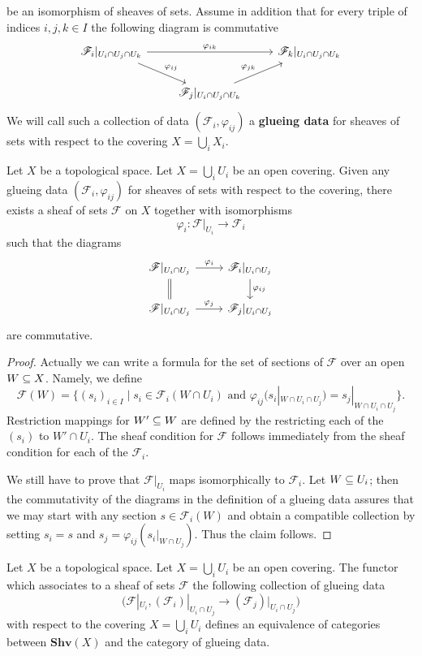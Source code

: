 be an isomorphism of sheaves of sets. Assume in addition that for every triple of indices $i,j,k\in I$ the following diagram is commutative
\[\begin{tikzcd}
\mathscr{F}_i|_{U_i\cap U_j\cap U_k}\ar[rr,"\varphi_{ik}"]\ar[rd,"\varphi_{ij}"]&&\mathscr{F}_k|_{U_i\cap U_j\cap U_k}\\
&\mathscr{F}_j|_{U_i\cap U_j\cap U_k}\ar[ru,"\varphi_{jk}"]
\end{tikzcd}\]
We will call such a collection of data $(\mathscr{F}_i,\varphi_{ij})$ a \textbf{glueing data} for sheaves of sets with respect to the covering $X=\bigcup_iX_i$.
\begin{proposition}\label{sheaf glue construction}
Let $X$ be a topological space. Let $X=\bigcup_iU_i$ be an open covering. Given any glueing data $(\mathscr{F}_i,\varphi_{ij})$ for sheaves of sets with respect to the covering, there exists a sheaf of sets $\mathscr{F}$ on $X$ together with isomorphisms
\[\varphi_i:\mathscr{F}|_{U_i}\to\mathscr{F}_i\]
such that the diagrams
\[\begin{tikzcd}
\mathscr{F}|_{U_i\cap U_j}\ar[r,"\varphi_i"]\ar[d,equal]&\mathscr{F}_i|_{U_i\cap U_j}\ar[d,"\varphi_{ij}"]\\
\mathscr{F}|_{U_i\cap U_j}\ar[r,"\varphi_j"]&\mathscr{F}_j|_{U_i\cap U_j}
\end{tikzcd}\]
are commutative.
\end{proposition}
\begin{proof}
Actually we can write a formula for the set of sections of $\mathscr{F}$ over an open $W\subseteq X$. Namely, we define
\[\mathscr{F}(W)=\{(s_i)_{i\in I}\mid\text{$s_i\in\mathscr{F}_i(W\cap U_i)$ and $\varphi_{ij}(s_i|_{W\cap U_i\cap U_j})=s_j|_{W\cap U_i\cap U_j}$}\}.\]
Restriction mappings for $W'\subseteq W$ are defined by the restricting each of the $(s_i)$ to $W'\cap U_i$. The sheaf condition for $\mathscr{F}$ follows immediately from the sheaf condition for each of the $\mathscr{F}_i$.\par
We still have to prove that $\mathscr{F}|_{U_i}$ maps isomorphically to $\mathscr{F}_i$. Let $W\subseteq U_i$; then the commutativity of the diagrams in the definition of a glueing data assures that we may start with any section $s\in\mathscr{F}_i(W)$ and obtain a compatible collection by setting $s_i=s$ and $s_j=\varphi_{ij}(s_{i}|_{W\cap U_j})$. Thus the claim follows.
\end{proof}
\begin{corollary}\label{sheaf cat equivalent to glueing data}
Let $X$ be a topological space. Let $X=\bigcup_iU_i$ be an open covering. The functor which associates to a sheaf of sets $\mathscr{F}$ the following collection of glueing data
\[\big(\mathscr{F}|_{U_i},(\mathscr{F}_i)|_{U_i\cap U_j}\to(\mathscr{F}_j)|_{U_i\cap U_j}\big)\]
with respect to the covering $X=\bigcup_iU_i$ defines an equivalence of categories between $\mathbf{Shv}(X)$ and the category of glueing data.
\end{corollary}
